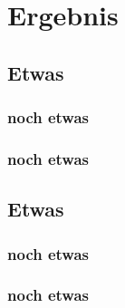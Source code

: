 \section{Ergebnis}\label{Ergebnis}


\subsection{Etwas}
\subsubsection{noch etwas}
\subsubsection{noch etwas}
\subsection{Etwas}
\subsubsection{noch etwas}
\subsubsection{noch etwas}
